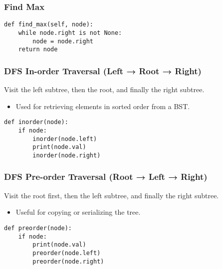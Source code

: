 \subsubsection{Find Max}
\begin{algo}
\begin{lstlisting}
def find_max(self, node):
    while node.right is not None:
        node = node.right
    return node
\end{lstlisting}
\end{algo}

\subsubsection{DFS In-order Traversal (Left → Root → Right)}
\begin{definition}
    Visit the left subtree, then the root, and finally the right subtree.
    \begin{itemize}
        \item Used for retrieving elements in sorted order from a BST.
    \end{itemize}
\end{definition}

\begin{algo}
\begin{lstlisting} 
def inorder(node):
    if node:
        inorder(node.left)
        print(node.val)
        inorder(node.right)
\end{lstlisting}  
\end{algo}

\subsubsection{DFS Pre-order Traversal (Root → Left → Right)}
\begin{definition}
    Visit the root first, then the left subtree, and finally the right subtree.
    \begin{itemize}
        \item Useful for copying or serializing the tree.
    \end{itemize}
\end{definition}

\begin{algo} 
\begin{lstlisting}
def preorder(node):
    if node:
        print(node.val)
        preorder(node.left)
        preorder(node.right)
\end{lstlisting}
\end{algo}

